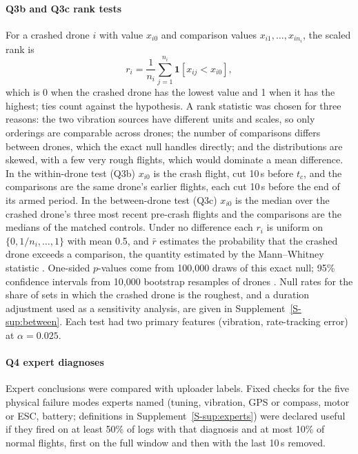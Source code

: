 \documentclass[preprint,12pt]{elsarticle}
\begin{document}
\paragraph{Q3b and Q3c rank tests} For a crashed drone $i$ with value $x_{i0}$ and comparison values
$x_{i1},\dots,x_{in_i}$, the scaled rank is
\begin{equation}
r_i=\frac{1}{n_i}\sum_{j=1}^{n_i}\mathbf{1}\left[x_{ij}<x_{i0}\right],
\end{equation}
which is 0 when the crashed drone has the lowest value and 1 when it has the highest; ties count against the
hypothesis. A rank statistic was chosen for three reasons: the two vibration sources have different units and scales,
so only orderings are comparable across drones; the number of comparisons differs between drones, which the exact null
handles directly; and the distributions are skewed, with a few very rough flights, which would dominate a mean
difference. In the within-drone test (Q3b) $x_{i0}$ is the crash flight, cut 10\,s before $t_c$, and the comparisons
are the same drone's earlier flights, each cut 10\,s before the end of its armed period. In the between-drone test (Q3c) $x_{i0}$ is the median over the crashed drone's
three most recent pre-crash flights and the comparisons are the medians of the matched controls. Under no difference
each $r_i$ is uniform on $\{0,1/n_i,\dots,1\}$ with mean 0.5, and $\bar r$ estimates the probability that the crashed
drone exceeds a comparison, the quantity estimated by the Mann--Whitney statistic \cite{mann1947test}. One-sided
$p$-values come from 100,000 draws of this exact null; 95\% confidence intervals from 10,000 bootstrap resamples of
drones \cite{efron1993bootstrap}. Null rates for the share of sets in which the crashed drone is the roughest, and a duration adjustment used as a sensitivity analysis, are given in Supplement~\ref{S-sup:between}. Each test had two
primary features (vibration, rate-tracking error) at $\alpha=0.025$.

\paragraph{Q4 expert diagnoses} Expert conclusions were compared with uploader labels. Fixed checks for the five physical failure modes experts named (tuning, vibration, GPS or compass, motor or ESC, battery; definitions in Supplement~\ref{S-sup:experts}) were declared useful if they fired on at least 50\% of logs with that diagnosis and at most 10\% of normal flights, first on the full window and then with the last 10\,s removed.
\end{document}
